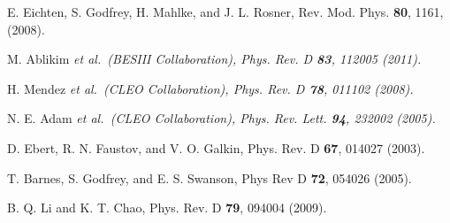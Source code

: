 \documentclass[aps,prd,twocolumn,showpacs,floatfix,byrevtex]{revtex4-1}
\newcommand{\etal}{\it et al.\rm}
\begin{document}
\begin{thebibliography}{99}

 E. Eichten, S. Godfrey, H. Mahlke, and J. L. Rosner, Rev. Mod. Phys. {\bf 80}, 1161, (2008).











 M. Ablikim \etal ~(BESIII Collaboration), Phys. Rev. D {\bf 83}, 112005
  (2011).



 H. Mendez \etal ~(CLEO Collaboration), Phys. Rev. D {\bf 78}, 011102 (2008).

 N. E. Adam \etal ~(CLEO Collaboration), Phys. Rev. Lett. {\bf 94}, 232002 (2005).

 D. Ebert, R. N. Faustov, and V. O. Galkin, Phys. Rev. D
  {\bf 67}, 014027 (2003).

 T. Barnes, S. Godfrey, and E. S. Swanson, Phys Rev D
  {\bf 72}, 054026 (2005).

 B. Q. Li and K. T. Chao, Phys. Rev. D {\bf 79}, 094004 (2009).



\end{thebibliography}
\end{document}
